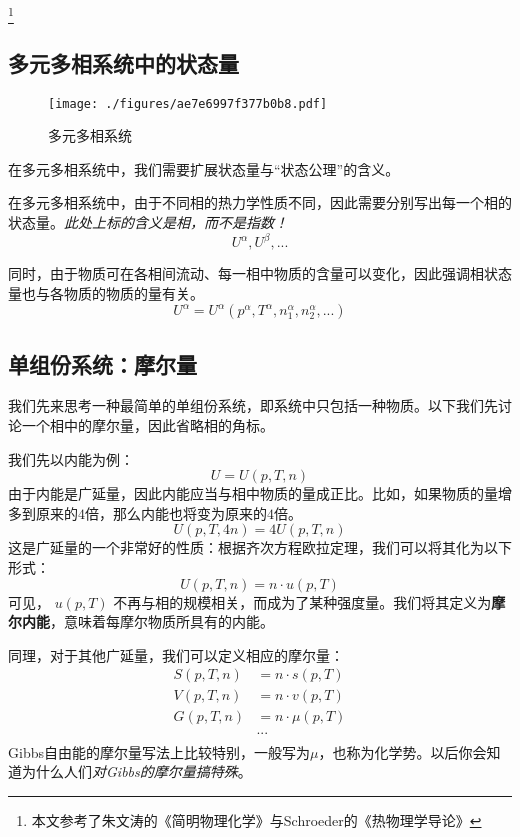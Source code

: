 
\begin{issues}
\issueDraft
\end{issues}

\footnote{本文参考了朱文涛的《简明物理化学》与Schroeder的《热物理学导论》}

\subsection{多元多相系统中的状态量}
\begin{figure}[ht]
\centering
\texttt{[image: ./figures/ae7e6997f377b0b8.pdf]}
\caption{多元多相系统} \label{fig_ParMol_1}
\end{figure}

在多元多相系统中，我们需要扩展状态量与“状态公理”的含义。

在多元多相系统中，由于不同相的热力学性质不同，因此需要分别写出每一个相的状态量。\textsl{此处上标的含义是相，而不是指数！}
$$U^\alpha, U^\beta,...$$

同时，由于物质可在各相间流动、每一相中物质的含量可以变化，因此强调相状态量也与各物质的物质的量有关。
$$U^\alpha = U^\alpha (p^\alpha, T^\alpha, n_1^\alpha,n_2^\alpha,...)$$

\subsection{单组份系统：摩尔量}
我们先来思考一种最简单的单组份系统，即系统中只包括一种物质。以下我们先讨论一个相中的摩尔量，因此省略相的角标。

我们先以内能为例：
$$U = U (p, T, n)$$
由于内能是广延量，因此内能应当与相中物质的量成正比。比如，如果物质的量增多到原来的$4$倍，那么内能也将变为原来的$4$倍。
$$U(p, T, 4 n) = 4 U (p, T, n)$$
这是广延量的一个非常好的性质：根据齐次方程欧拉定理，我们可以将其化为以下形式：
$$U(p, T, n) = n \cdot u (p, T)$$
可见， $u (p, T)$ 不再与相的规模相关，而成为了某种强度量。我们将其定义为\textbf{摩尔内能}，意味着每摩尔物质所具有的内能。

同理，对于其他广延量，我们可以定义相应的摩尔量：
$$
\begin{aligned}
S(p, T, n) &= n \cdot s (p, T)\\
V(p, T, n) &= n \cdot v (p, T)\\
G(p, T, n) &= n \cdot \mu (p, T)\\
&...\\
\end{aligned}
$$
Gibbs自由能的摩尔量写法上比较特别，一般写为$\mu$，也称为化学势。以后你会知道为什么人们\textsl{对Gibbs的摩尔量搞特殊}。

